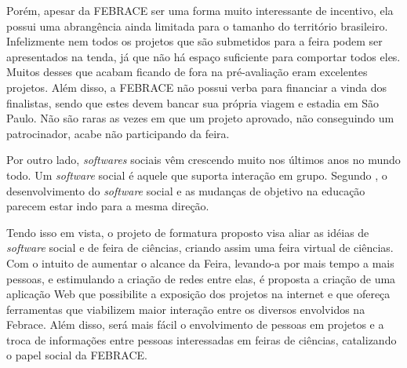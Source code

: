 Porém, apesar da FEBRACE ser uma forma muito interessante de incentivo, ela possui uma abrangência ainda limitada para o tamanho do território brasileiro. Infelizmente nem todos os projetos que são submetidos para a feira podem ser apresentados na tenda, já que não há espaço suficiente para comportar todos eles. Muitos desses que acabam ficando de fora na pré-avaliação eram excelentes projetos. Além disso, a FEBRACE não possui verba para financiar a vinda dos finalistas, sendo que estes devem bancar sua própria viagem e estadia em São Paulo. Não são raras as vezes em que um projeto aprovado, não conseguindo um patrocinador, acabe não participando da feira.

Por outro lado, \textit{softwares} sociais vêm crescendo muito nos últimos anos no mundo todo. Um \textit{software} social é aquele que suporta interação em grupo. Segundo , o desenvolvimento do \textit{software} social e as mudanças de objetivo na educação parecem estar indo para a mesma direção.

Tendo isso em vista, o projeto de formatura proposto visa aliar as idéias de \textit{software} social e de feira de ciências, criando assim uma feira virtual de ciências. Com o intuito de aumentar o alcance da Feira, levando-a por mais tempo a mais pessoas, e estimulando a criação de redes entre elas, é proposta a criação de uma aplicação Web que possibilite a exposição dos projetos na internet e que ofereça ferramentas que viabilizem maior interação entre os diversos envolvidos na Febrace. Além disso, será mais fácil o envolvimento de pessoas em projetos e a troca de informações entre pessoas interessadas em feiras de ciências, catalizando o papel social da FEBRACE.
